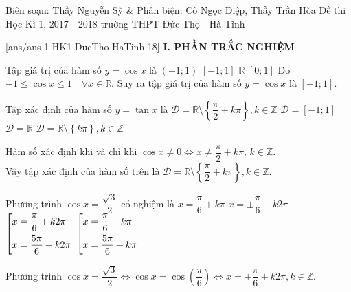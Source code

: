\begin{name}
{Biên soạn: Thầy Nguyễn Sỹ \& Phản biện: Cô Ngọc Diệp, Thầy Trần Hòa}
		{Đề thi Học Kì 1, 2017 - 2018 trường THPT Đức Thọ - Hà Tĩnh}
	\end{name}
	\setcounter{ex}{0}\setcounter{bt}{0}
	[ans/ans-1-HK1-DucTho-HaTinh-18]
\noindent\textbf{I. PHẦN TRẮC NGHIỆM}
\begin{ex}%
	Tập giá trị của hàm số $y=\cos x$ là
		\choice
	{$(-1;1)$}
	{\True $[-1;1]$}
	{$\mathbb{R}$}
	{$[0;1]$}
	\loigiai
	{ Do $-1 \leq \cos x \leq 1 \quad \forall x \in \mathbb{R}$. Suy ra tập giá trị của hàm số $y=\cos x$ là $[-1;1]$.
	}
\end{ex}

\begin{ex}%
	Tập xác định của hàm số $y=\tan x$ là
		\choice
	{\True $\mathscr {D} = \mathbb{R}\setminus \left \{ \dfrac{\pi}{2}+ k\pi  \right\} , k \in \mathbb{Z} $}
	{$\mathscr {D} =[-1;1]$}
	{$\mathscr {D} =\mathbb{R}$}
	{$\mathscr {D} = \mathbb{R}\setminus \left \{ k\pi  \right\} , k \in \mathbb{Z} $}
	\loigiai
	{Hàm số xác định khi và chỉ khi $\cos x \neq 0 \Leftrightarrow x\neq \dfrac{\pi}{2}+k\pi,\,k\in \mathbb{Z}.$\\
		Vậy tập xác định của hàm số trên là $\mathscr {D} = \mathbb{R}\setminus \left \{ \dfrac{\pi}{2}+ k\pi  \right\} , k \in \mathbb{Z} $.
		
	}
\end{ex}

\begin{ex}%
	Phương trình $\cos x =\dfrac{\sqrt{3}}{2}$ có nghiệm là
		\choice
	{$x= \dfrac{\pi}{6}+k\pi$}
	{\True $x= \pm \dfrac{\pi}{6}+k2\pi $}
	{$\left[\begin{aligned}&x=\dfrac{\pi}{6}+k2\pi \\& x=\dfrac{5\pi}{6}+k2\pi\end{aligned}\right.$}
	{$\left[\begin{aligned}&x=\dfrac{\pi}{6}+k\pi \\& x=\dfrac{5\pi}{6}+k\pi\end{aligned}\right.$}
	\loigiai
	{ Phương trình $\cos x =\dfrac{\sqrt{3}}{2} \Leftrightarrow \cos x =\cos \left( \dfrac{\pi}{6}\right)\Leftrightarrow x= \pm \dfrac{\pi}{6}+k2\pi, k\in \mathbb{Z}. $
		
	}
	
\end{ex}

